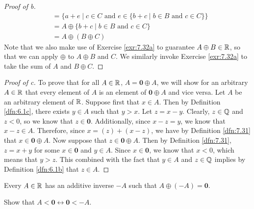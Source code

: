 \documentclass[../main.tex]{subfiles}
\begin{document}
\begin{exercise}
\begin{proof}[Proof of b]
\begin{align*}
            &= \{a+e\mid c\in C\text{ and }e\in\{b+c\mid b\in B\text{ and }c\in C\}\}\\
            &= A\oplus\{b+c\mid b\in B\text{ and }c\in C\}\\
            &= A\oplus(B\oplus C)
        \end{align*}
        Note that we also make use of Exercise \ref{exr:7.32a} to guarantee $A\oplus B\in\mathbb{R}$, so that we can apply $\oplus$ to $A\oplus B$ and $C$. We similarly invoke Exercise \ref{exr:7.32a} to take the sum of $A$ and $B\oplus C$.
    \end{proof}
    \begin{proof}[Proof of c]
        To prove that for all $A\in\mathbb{R}$, $A=\bm{0}\oplus A$, we will show for an arbitrary $A\in\mathbb{R}$ that every element of $A$ is an element of $\bm{0}\oplus A$ and vice versa. Let $A$ be an arbitrary element of $\mathbb{R}$. Suppose first that $x\in A$. Then by Definition \ref{dfn:6.1c}, there exists $y\in A$ such that $y>x$. Let $z=x-y$. Clearly, $z\in\mathbb{Q}$ and $z<0$, so we know that $z\in\bm{0}$. Additionally, since $x-z=y$, we know that $x-z\in A$. Therefore, since $x=(z)+(x-z)$, we have by Definition \ref{dfn:7.31} that $x\in\bm{0}\oplus A$. Now suppose that $z\in\bm{0}\oplus A$. Then by Definition \ref{dfn:7.31}, $z=x+y$ for some $x\in\bm{0}$ and $y\in A$. Since $x\in\bm{0}$, we know that $x<0$, which means that $y>z$. This combined with the fact that $y\in A$ and $z\in\mathbb{Q}$ implies by Definition \ref{dfn:6.1b} that $z\in A$.
    \end{proof}
\end{exercise}

\setcounter{theorem}{34}

\begin{theorem}\label{trm:7.35}
    Every $A\in\mathbb{R}$ has an additive inverse $-A$ such that $A\oplus(-A)=\bm{0}$.
\end{theorem}

\begin{exercise}\label{exr:7.36}
    Show that $A<\bm{0}\leftrightarrow\bm{0}<-A$.
\end{exercise}

\setcounter{theorem}{38}
\end{document}
